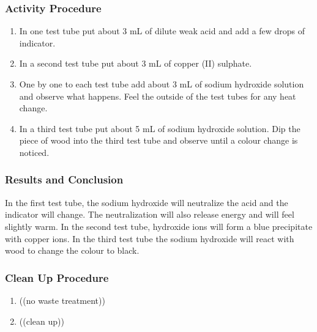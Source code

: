 \subsubsection*{Activity Procedure}
\begin{enumerate}
\item{In one test tube put about 3 mL of dilute weak acid and add a few drops of indicator.}
\item{In a second test tube put about 3 mL of copper (II) sulphate.}
\item{One by one to each test tube add about 3 mL of sodium hydroxide solution and observe what happens. Feel the outside of the test tubes for any heat change.}
\item{In a third test tube put about 5 mL of sodium hydroxide solution. Dip the piece of wood into the third test tube and observe until a colour change is noticed.}
\end{enumerate}

\subsubsection*{Results and Conclusion}
In the first test tube, the sodium hydroxide will neutralize the acid and the indicator will change. The neutralization will also release energy and will feel slightly warm.
In the second test tube, hydroxide ions will form a blue precipitate with copper ions.
In the third test tube the sodium hydroxide will react with wood to change the colour to black.

\subsubsection*{Clean Up Procedure}
\begin{enumerate}
\item{((no waste treatment))}
\item{((clean up))}
\end{enumerate}
